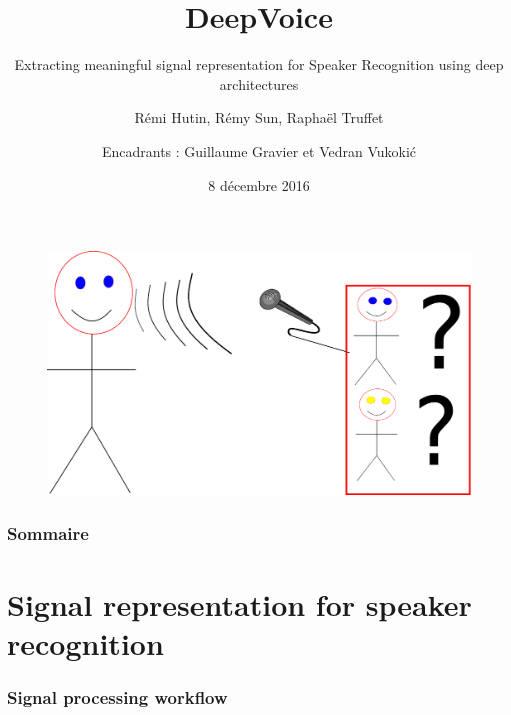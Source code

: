 \documentclass[11pt,english]{beamer}
\title{DeepVoice}
\subtitle{Extracting meaningful signal representation for Speaker Recognition
  using deep architectures}
\author{Rémi Hutin, Rémy Sun, Raphaël Truffet \and Encadrants : Guillaume Gravier et Vedran Vukoki\'c}
\institute{ENS Rennes, IRISA}
\date{8 décembre 2016}
\begin{document}
\begin{frame}
    \titlepage
\end{frame}

\begin{frame}
	\begin{figure}
		\centering
       	\includegraphics[scale = 0.5]{intro.pdf}
	\end{figure}
\end{frame}


\begin{frame}
    \frametitle{Sommaire}
    \tableofcontents[hideallsubsections]
\end{frame}


\section{Signal representation for speaker recognition}


\begin{frame}
  \frametitle{Signal processing workflow}
    \centering
\end{frame}
\end{document}
